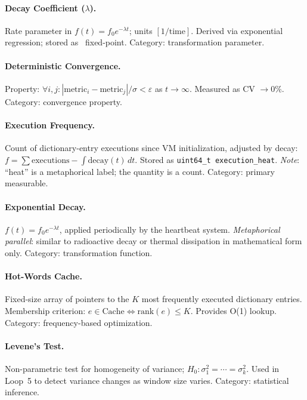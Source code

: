 \paragraph{Decay Coefficient ($\lambda$).}
Rate parameter in $f(t) = f_0 e^{-\lambda t}$; units $[1/\text{time}]$.
Derived via exponential regression; stored as \Qtype\ fixed-point.
Category: transformation parameter.

\paragraph{Deterministic Convergence.}
Property: $\forall i, j\colon |\text{metric}_i - \text{metric}_j| / \sigma
< \varepsilon$ as $t \to \infty$. Measured as CV $\to 0\%$.
Category: convergence property.

\paragraph{Execution Frequency.}
Count of dictionary-entry executions since VM initialization, adjusted
by decay: $f = \sum \text{executions} - \int \text{decay}(t)\,dt$.
Stored as \texttt{uint64\_t execution\_heat}.
\emph{Note}: ``heat'' is a metaphorical label; the quantity is a count.
Category: primary measurable.

\paragraph{Exponential Decay.}
$f(t) = f_0 e^{-\lambda t}$, applied periodically by the heartbeat system.
\emph{Metaphorical parallel}: similar to radioactive decay or thermal
dissipation in mathematical form only. Category: transformation function.

\paragraph{Hot-Words Cache.}
Fixed-size array of pointers to the $K$ most frequently executed dictionary
entries. Membership criterion: $e \in \text{Cache} \iff \text{rank}(e) \leq K$.
Provides O(1) lookup. Category: frequency-based optimization.

\paragraph{Levene's Test.}
Non-parametric test for homogeneity of variance; $H_0\colon \sigma_1^2 =
\cdots = \sigma_k^2$. Used in Loop~5 to detect variance changes as window
size varies. Category: statistical inference.

